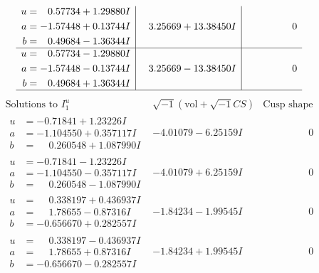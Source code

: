 \documentclass[1p]{elsarticle_modified}
\theoremstyle{definition}
\newcommand{\I}{\sqrt{-1}}
\begin{document}
$$\begin{array}{c|c|c}
\begin{aligned}
u &= \phantom{-}0.57734 + 1.29880 I \\
a &= -1.57448 + 0.13744 I \\
b &= \phantom{-}0.49684 - 1.36344 I\end{aligned}
 & \phantom{-}3.25669 + 13.38450 I & \phantom{-0.000000 } 0 \\ \hline\begin{aligned}
u &= \phantom{-}0.57734 - 1.29880 I \\
a &= -1.57448 - 0.13744 I \\
b &= \phantom{-}0.49684 + 1.36344 I\end{aligned}
 & \phantom{-}3.25669 - 13.38450 I & \phantom{-0.000000 } 0\\
 \hline 
 \end{array}$$\newpage$$\begin{array}{c|c|c}  
\text{Solutions to }I^u_{1}& \I (\text{vol} + \sqrt{-1}CS) & \text{Cusp shape}\\
 \hline 
\begin{aligned}
u &= -0.71841 + 1.23226 I \\
a &= -1.104550 + 0.357117 I \\
b &= \phantom{-}0.260548 + 1.087990 I\end{aligned}
 & -4.01079 - 6.25159 I & \phantom{-0.000000 } 0 \\ \hline\begin{aligned}
u &= -0.71841 - 1.23226 I \\
a &= -1.104550 - 0.357117 I \\
b &= \phantom{-}0.260548 - 1.087990 I\end{aligned}
 & -4.01079 + 6.25159 I & \phantom{-0.000000 } 0 \\ \hline\begin{aligned}
u &= \phantom{-}0.338197 + 0.436937 I \\
a &= \phantom{-}1.78655 - 0.87316 I \\
b &= -0.656670 + 0.282557 I\end{aligned}
 & -1.84234 - 1.99545 I & \phantom{-0.000000 } 0 \\ \hline\begin{aligned}
u &= \phantom{-}0.338197 - 0.436937 I \\
a &= \phantom{-}1.78655 + 0.87316 I \\
b &= -0.656670 - 0.282557 I\end{aligned}
 & -1.84234 + 1.99545 I & \phantom{-0.000000 } 0 \\ \hline\begin{aligned}

\end{aligned}
\end{array}$$
\end{document}
